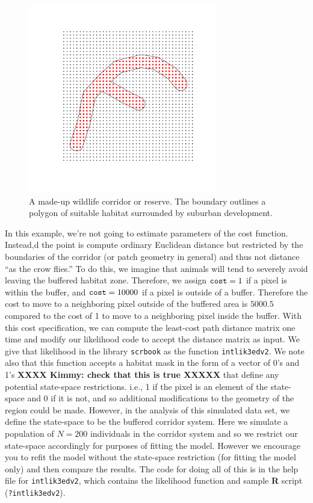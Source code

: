 \begin{figure}[h]
\begin{center}
\includegraphics[height=3.25in,width=3.25in]{Ch10-EcolDist/figs/corridor}
\end{center}
\caption{A made-up wildlife corridor or reserve. The boundary outlines
  a polygon of suitable habitat surrounded by suburban development.}
\label{ecoldist.fig.corridor}
\end{figure}

In this example, we're not going to estimate parameters of the cost
function. Instead,d the point is compute ordinary Euclidean distance
but restricted by the boundaries of the corridor (or patch geometry in
general) and thus not distance ``as the crow flies.''  To do this, we
imagine that animals will tend to severely avoid leaving the buffered
habitat zone. Therefore, we assign $\mbox{\tt cost}=1$ if a pixel is
within the buffer, and $\mbox{\tt cost} = 10000$ if a pixel is outside
of a buffer. Therefore the cost to move to a neighboring pixel outside
of the buffered area is $5000.5$ compared to the cost of 1 to move to
a neighboring pixel inside the buffer.  With this cost specification,
we can compute the least-cost path distance matrix one time and modify
our likelihood code to accept the distance matrix as input. We give
that likelihood in the library \mbox{\tt scrbook} as the function
\mbox{\tt intlik3edv2}.  We note also that this function accepts a
habitat mask in the form of a vector of 0's
and 1's {\bf XXXX Kimmy: check that this is true XXXXX}
that define any potential state-space restrictions. i.e., 1 if
the pixel is an element of the state-space and 0 if it is not, and so
additional modifications to the geometry of the region could be made.
However, in the analysis of this simulated data set, we define the
state-space to be the buffered corridor system.  Here we simulate a
population of $N=200$ individuals in the corridor system and so we
restrict our state-space accordingly for purposes of fitting the
model. However we encourage you to refit the model without the
state-space restriction (for fitting the model only) and then compare
the results.  The code for doing all of this is in the help file for
\mbox{\tt intlik3edv2}, which contains the likelihood function and
sample {\bf R} script (\mbox{\tt ?intlik3edv2}).

